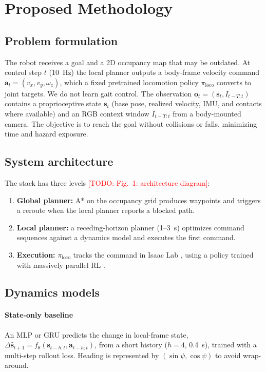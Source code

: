 \documentclass[conference]{IEEEtran}
\newcommand{\todo}[1]{\textcolor{red}{[TODO: #1]}}
\newcommand{\vect}[1]{\mathbf{#1}}
\begin{document}
\section{Proposed Methodology}

\subsection{Problem formulation}
The robot receives a goal and a 2D occupancy map that may be outdated.
At control step $t$ (10~Hz) the local planner outputs a body-frame
velocity command $\vect{a}_t = (v_x, v_y, \omega_z)$, which a fixed
pretrained locomotion policy $\pi_{\text{loco}}$ converts to joint
targets. We do not learn gait control. The observation
$\vect{o}_t = (\vect{s}_t, I_{t-T:t})$ contains a proprioceptive state
$\vect{s}_t$ (base pose, realized velocity, IMU, and contacts where
available) and an RGB context window $I_{t-T:t}$ from a body-mounted
camera. The objective is to reach the goal without collisions or falls,
minimizing time and hazard exposure.

\subsection{System architecture}
The stack has three levels \todo{Fig.~1: architecture diagram}:
\begin{enumerate}
  \item \textbf{Global planner:} A* \cite{hart1968astar} on the occupancy
        grid produces waypoints and triggers a reroute when the local
        planner reports a blocked path.
  \item \textbf{Local planner:} a receding-horizon planner (1--3~s)
        optimizes command sequences against a dynamics model and
        executes the first command.
  \item \textbf{Execution:} $\pi_{\text{loco}}$ tracks the command in
        Isaac Lab \cite{nvidia2025isaaclab}, using a policy trained with
        massively parallel RL \cite{rudin2021walk}.
\end{enumerate}

\subsection{Dynamics models}
\paragraph{State-only baseline}
An MLP or GRU predicts the change in local-frame state,
$\Delta\hat{\vect{s}}_{t+1} = f_\theta(\vect{s}_{t-h:t}, \vect{a}_{t-h:t})$,
from a short history ($h{=}4$, 0.4~s), trained with a multi-step rollout
loss. Heading is represented by $(\sin\psi, \cos\psi)$ to avoid
wrap-around.
\end{document}
